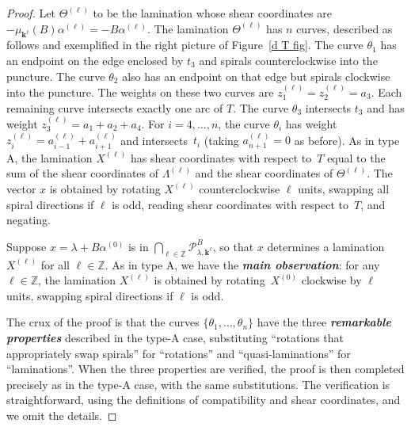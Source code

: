 \documentclass[10pt]{article}
\theoremstyle{definition}
\theoremstyle{remark}
\numberwithin{equation}{section}
\newcommand{\newword}[1]{\textbf{\emph{#1}}}
\newcommand{\integers}{\mathbb Z}
\newcommand{\set}[1]{{\lbrace #1 \rbrace}}
\newcommand{\0}{{\mathbf{0}}}
\newcommand{\kk}{{\boldsymbol{k}}}
\renewcommand{\P}{\mathcal{P}}
\begin{document}
\begin{proof}
Let $\Theta^{(\ell)}$ to be the lamination whose shear coordinates are $-\mu_{\kk^\ell}(B)\alpha^{(\ell)}=-B\alpha^{(\ell)}$.
The lamination $\Theta^{(\ell)}$ has $n$ curves, described as follows and exemplified in the right picture of  Figure~\ref{d T fig}.
The curve $\theta_1$ has an endpoint on the edge enclosed by $t_3$ and spirals counterclockwise into the puncture.
The curve $\theta_2$ also has an endpoint on that edge but spirals clockwise into the puncture.
The weights on these two curves are $z_1^{(\ell)}=z_2^{(\ell)}=a_3$.
Each remaining curve intersects exactly one arc of $T$.
The curve $\theta_3$ intersects $t_3$ and has weight $z_3^{(\ell)}=a_1+a_2+a_4$.
For $i=4,\ldots,n$, the curve $\theta_i$ has weight $z_i^{(\ell)}=a_{i-1}^{(\ell)}+a_{i+1}^{(\ell)}$ and intersects~$t_i$ (taking $a_{n+1}^{(\ell)}=0$ as before).
As in type A, the lamination $X^{(\ell)}$ has shear coordinates with respect to~$T$ equal to the sum of the shear coordinates of $\Lambda^{(\ell)}$ and the shear coordinates of $\Theta^{(\ell)}$.
The vector $x$ is obtained by rotating $X^{(\ell)}$ counterclockwise $\ell$ units, swapping all spiral directions if $\ell$ is odd, reading shear coordinates with respect to~$T$, and negating.

Suppose $x=\lambda+B\alpha^{(0)}$ is in $\bigcap_{\ell\in\integers}\P^B_{\lambda,\kk^\ell}$, so that $x$ determines a lamination $X^{(\ell)}$ for all $\ell\in\integers$.
As in type A, we have the \newword{main observation}:
for any $\ell\in\integers$, the lamination $X^{(\ell)}$ is obtained by rotating~$X^{(0)}$ clockwise by $\ell$ units, swapping spiral directions if $\ell$ is odd.

The crux of the proof is that the curves $\set{\theta_1,\ldots,\theta_n}$ have the three \newword{remarkable properties} described in the type-A case, substituting ``rotations that appropriately swap spirals'' for ``rotations'' and ``quasi-laminations'' for ``laminations''.
When the three properties are verified, the proof is then completed precisely as in the type-A case, with the same substitutions.
The verification is straightforward, using the definitions of compatibility and shear coordinates, and we omit the details.


\end{proof}
\end{document}
